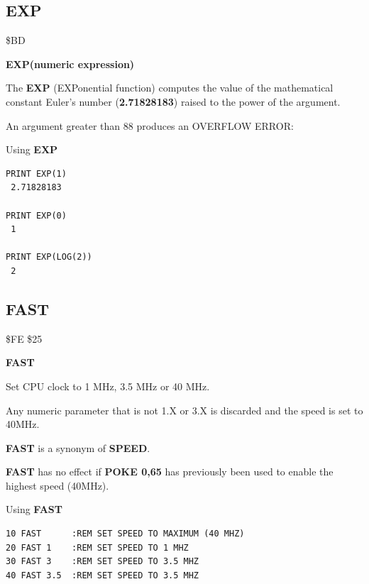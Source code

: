 \subsection{EXP}
\begin{description}[leftmargin=2cm,style=nextline]
\item [Token:] \$BD
\item [Format:] {\bf EXP(numeric expression)}
\item [Usage:] The {\bf EXP} (EXPonential function) computes
               the value of the mathematical constant
               Euler's number ({\bf 2.71828183})
               raised to the power of the
               argument.

\item [Remarks:] An argument greater than 88 produces
                 an OVERFLOW ERROR:
\item [Examples:] Using {\bf EXP}
\begin{tcolorbox}[colback=black,coltext=white]
\verbatimfont{\codefont}
\begin{verbatim}
PRINT EXP(1)
 2.71828183

PRINT EXP(0)
 1

PRINT EXP(LOG(2))
 2
\end{verbatim}
\end{tcolorbox}
\end{description}


\newpage
\subsection{FAST}
\begin{description}[leftmargin=2cm,style=nextline]
\item [Token:] \$FE \$25
\item [Format:] {\bf FAST}
\item [Usage:] Set CPU clock to 1 MHz, 3.5 MHz or 40 MHz.
\item [Remarks:] Any numeric parameter that is not 1.X or 3.X
                 is discarded and the speed is set to 40MHz.

                 {\bf FAST} is a synonym of {\bf SPEED}.

                 {\bf FAST} has no effect if {\bf POKE 0,65}
                 has previously been used to enable the highest speed (40MHz).

\item [Example:] Using {\bf FAST}
\begin{tcolorbox}[colback=black,coltext=white]
\verbatimfont{\codefont}
\begin{verbatim}
10 FAST      :REM SET SPEED TO MAXIMUM (40 MHZ)
20 FAST 1    :REM SET SPEED TO 1 MHZ
30 FAST 3    :REM SET SPEED TO 3.5 MHZ
40 FAST 3.5  :REM SET SPEED TO 3.5 MHZ
\end{verbatim}
\end{tcolorbox}
\end{description}


